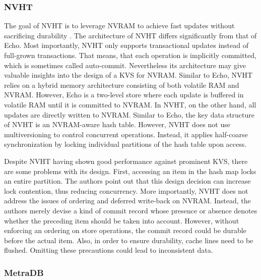 \subsubsection{NVHT}

The goal of NVHT is to leverage NVRAM to achieve fast updates without
sacrificing durability \cite{zhou2016nvht}. The architecture of NVHT differs
significantly from that of Echo. Most importantly, NVHT only supports
transactional updates instead of full-grown transactions. That means, that each
operation is implicitly committed, which is sometimes called auto-commit.
Nevertheless its architecture may give valuable insights into the design of a
KVS for NVRAM. Similar to Echo, NVHT relies on a hybrid memory architecture
consisting of both volatile RAM and NVRAM. However, Echo is a two-level store
where each update is buffered in volatile RAM until it is committed to NVRAM. In
NVHT, on the other hand, all updates are directly written to NVRAM. Similar to
Echo, the key data structure of NVHT is an NVRAM-aware hash table. However, NVHT
does not use multiversioning to control concurrent operations. Instead, it
applies half-coarse synchronization by locking individual partitions of the hash
table upon access.

Despite NVHT having shown good performance against prominent KVS, there are some
problems with its design. First, accessing an item in the hash map locks an
entire partition. The authors point out that this design decision can increase
lock contention, thus reducing concurrency. More importantly, NVHT does not
address the issues of ordering and deferred write-back on NVRAM. Instead, the
authors merely devise a kind of commit record whose presence or absence denotes
whether the preceding item should be taken into account. However, without
enforcing an ordering on store operations, the commit record could be durable
before the actual item. Also, in order to ensure durability, cache lines need to
be flushed. Omitting these precautions could lead to inconsistent data.

\subsubsection{MetraDB}

